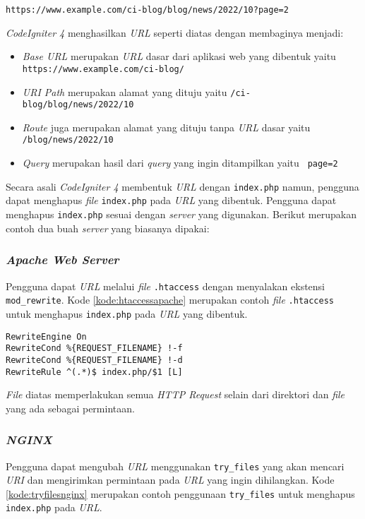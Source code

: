 \begin{center}
\texttt{https://www.example.com/ci-blog/blog/news/2022/10?page=2}
\end{center}

\textit{CodeIgniter 4} menghasilkan \textit{URL} seperti diatas dengan membaginya menjadi:

\begin{itemize}
\item \textit{Base URL} merupakan \textit{URL} dasar dari aplikasi web yang dibentuk yaitu \texttt{	
https://www.example.com/ci-blog/}
\item \textit{URI Path} merupakan alamat yang dituju yaitu \texttt{/ci-blog/blog/news/2022/10} 
\item \textit{Route} juga merupakan alamat yang dituju tanpa \textit{URL} dasar yaitu \texttt{/blog/news/2022/10} 
\item \textit{Query} merupakan hasil dari \textit{query} yang ingin ditampilkan yaitu \texttt{	
page=2}
\end{itemize}

Secara asali \textit{CodeIgniter 4} membentuk \textit{URL} dengan \verb|index.php| namun, pengguna dapat menghapus \textit{file} \verb|index.php| pada \textit{URL} yang dibentuk. Pengguna dapat menghapus \verb|index.php| sesuai dengan \textit{server} yang digunakan. Berikut merupakan contoh dua buah \textit{server} yang biasanya dipakai:

\subsubsection{\textit{Apache Web Server}}
Pengguna dapat \textit{URL} melalui \textit{file} \verb|.htaccess| dengan menyalakan ekstensi \verb|mod_rewrite|. Kode \ref{kode:htaccessapache} merupakan contoh \textit{file} \verb|.htaccess| untuk menghapus \verb|index.php| pada \textit{URL} yang dibentuk.

\begin{lstlisting}[caption=Contoh \textit{file} \texttt{.htacess} pada \textit{Apache Web Server}. ,label=kode:htaccessapache]
RewriteEngine On
RewriteCond %{REQUEST_FILENAME} !-f
RewriteCond %{REQUEST_FILENAME} !-d
RewriteRule ^(.*)$ index.php/$1 [L]
\end{lstlisting}

\textit{File} diatas memperlakukan semua \textit{HTTP Request} selain dari direktori dan \textit{file} yang ada sebagai permintaan.

\subsubsection{\textit{NGINX}}
Pengguna dapat mengubah \textit{URL} menggunakan \verb|try_files| yang akan mencari \textit{URI} dan mengirimkan permintaan pada \textit{URL} yang ingin dihilangkan. Kode \ref{kode:tryfilesnginx} merupakan contoh penggunaan \verb|try_files| untuk menghapus \verb|index.php| pada \textit{URL}.

